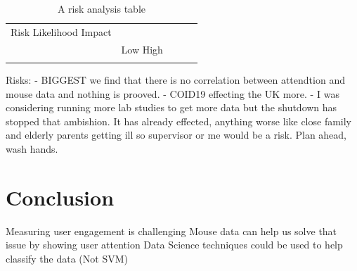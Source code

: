 \documentclass{article}
\begin{document}
\begin{table}[ht]
    \caption{A risk analysis table}
    \centering
    \begin{tabular}{lllll}
     Risk   Likelihood  Impact  &  \\
     &      Low         High       &  \\
     &      &           &       &  \\
     
    \end{tabular}
\end{table}


Risks: 
- BIGGEST we find that there is no correlation between attendtion and mouse data and nothing is prooved.
- COID19 effecting the UK more. - I was considering running more lab studies to get more data but the shutdown has stopped that ambishion.
    It has already effected, anything worse like close family and elderly parents getting ill so supervisor or me would be a risk.
    Plan ahead, wash hands.


\section{Conclusion}

Measuring user engagement is challenging
Mouse data can help us solve that issue by showing user attention
Data Science techniques could be used to help classify the data (Not SVM)


\printbibliography
\end{document}

